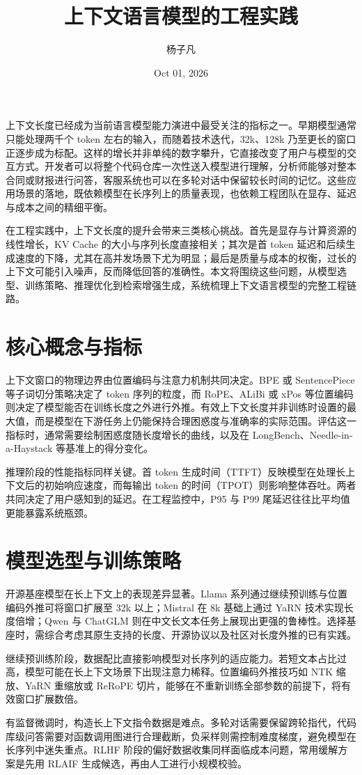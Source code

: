 \title{上下文语言模型的工程实践}
\author{杨子凡}
\date{Oct 01, 2026}
\maketitle
上下文长度已经成为当前语言模型能力演进中最受关注的指标之一。早期模型通常只能处理两千个 token 左右的输入，而随着技术迭代，32k、128k 乃至更长的窗口正逐步成为标配。这样的增长并非单纯的数字攀升，它直接改变了用户与模型的交互方式。开发者可以将整个代码仓库一次性送入模型进行理解，分析师能够对整本合同或财报进行问答，客服系统也可以在多轮对话中保留较长时间的记忆。这些应用场景的落地，既依赖模型在长序列上的质量表现，也依赖工程团队在显存、延迟与成本之间的精细平衡。\par
在工程实践中，上下文长度的提升会带来三类核心挑战。首先是显存与计算资源的线性增长，KV Cache 的大小与序列长度直接相关；其次是首 token 延迟和后续生成速度的下降，尤其在高并发场景下尤为明显；最后是质量与成本的权衡，过长的上下文可能引入噪声，反而降低回答的准确性。本文将围绕这些问题，从模型选型、训练策略、推理优化到检索增强生成，系统梳理上下文语言模型的完整工程链路。\par
\chapter{核心概念与指标}
上下文窗口的物理边界由位置编码与注意力机制共同决定。BPE 或 SentencePiece 等子词切分策略决定了 token 序列的粒度，而 RoPE、ALiBi 或 xPos 等位置编码则决定了模型能否在训练长度之外进行外推。有效上下文长度并非训练时设置的最大值，而是模型在下游任务上仍能保持合理困惑度与准确率的实际范围。评估这一指标时，通常需要绘制困惑度随长度增长的曲线，以及在 LongBench、Needle-in-a-Haystack 等基准上的得分变化。\par
推理阶段的性能指标同样关键。首 token 生成时间（TTFT）反映模型在处理长上下文后的初始响应速度，而每输出 token 的时间（TPOT）则影响整体吞吐。两者共同决定了用户感知到的延迟。在工程监控中，P95 与 P99 尾延迟往往比平均值更能暴露系统瓶颈。\par
\chapter{模型选型与训练策略}
开源基座模型在长上下文上的表现差异显著。Llama 系列通过继续预训练与位置编码外推可将窗口扩展至 32k 以上；Mistral 在 8k 基础上通过 YaRN 技术实现长度倍增；Qwen 与 ChatGLM 则在中文长文本任务上展现出更强的鲁棒性。选择基座时，需综合考虑其原生支持的长度、开源协议以及社区对长度外推的已有实践。\par
继续预训练阶段，数据配比直接影响模型对长序列的适应能力。若短文本占比过高，模型可能在长上下文场景下出现注意力稀释。位置编码外推技巧如 NTK 缩放、YaRN 重缩放或 ReRoPE 切片，能够在不重新训练全部参数的前提下，将有效窗口扩展数倍。\par
有监督微调时，构造长上下文指令数据是难点。多轮对话需要保留跨轮指代，代码库级问答需要对函数调用图进行合理截断，负采样则需控制难度梯度，避免模型在长序列中迷失重点。RLHF 阶段的偏好数据收集同样面临成本问题，常用缓解方案是先用 RLAIF 生成候选，再由人工进行小规模校验。\par
